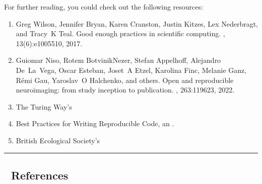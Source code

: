 \documentclass[letterpaper,10pt,english]{jupyterBook}
\begin{document}
\sphinxAtStartPar
For further reading, you could check out the following resources:
\begin{enumerate}
%
\item {} 
\sphinxAtStartPar
{} %
\begin{footnote}[1]\sphinxAtStartFootnote
Greg Wilson, Jennifer Bryan, Karen Cranston, Justin Kitzes, Lex Nederbragt, and Tracy K Teal. Good enough practices in scientific computing. , 13(6):e1005510, 2017.
%
\end{footnote}

\item {} 
\sphinxAtStartPar
{} %
\begin{footnote}[2]\sphinxAtStartFootnote
Guiomar Niso, Rotem Botvinik\sphinxhyphen{}Nezer, Stefan Appelhoff, Alejandro De La Vega, Oscar Esteban, Joset A Etzel, Karolina Finc, Melanie Ganz, Rémi Gau, Yaroslav O Halchenko, and others. Open and reproducible neuroimaging: from study inception to publication. , 263:119623, 2022.
%
\end{footnote}

\item {} 
\sphinxAtStartPar
The Turing Way’s 

\item {} 
\sphinxAtStartPar
Best Practices for Writing Reproducible Code, an .

\item {} 
\sphinxAtStartPar
British Ecological Society’s 

\end{enumerate}


\bigskip\hrule\bigskip



\subsection{📑 References}
\label{\detokenize{chapters/02/02a_coding-best-practices:references}}
\end{document}
